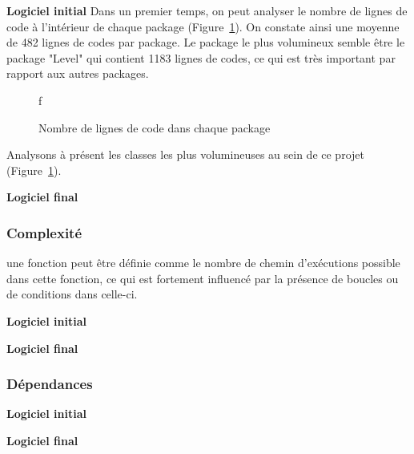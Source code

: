 \documentclass[12pt, openany]{report}
\begin{document}
\textbf{Logiciel initial}          
Dans un premier temps, on peut analyser le nombre de lignes de code à l'intérieur de chaque package (Figure~\ref{locinit}). On constate ainsi une moyenne de 482 lignes de codes par package. Le package le plus volumineux semble être le package "Level" qui contient 1183 lignes de codes, ce qui est très important par rapport aux autres packages.


\begin{figure}[!h]                                                                         f
	\centering
	\caption{Nombre de lignes de code dans chaque package}
	\label{locinit}      
\end{figure}
\newpage
Analysons à présent les classes les plus volumineuses au sein de ce projet (Figure~\ref{locinit}).



\textbf{Logiciel final}


\subsubsection*{Complexité}
                                                                                                                            une fonction peut être définie comme le nombre de chemin d'exécutions possible dans cette fonction, ce qui est fortement influencé par la présence de boucles ou de conditions dans celle-ci.

\textbf{Logiciel initial}

\textbf{Logiciel final}



\subsubsection*{Dépendances}
\textbf{Logiciel initial}

\textbf{Logiciel final}


\end{document}
